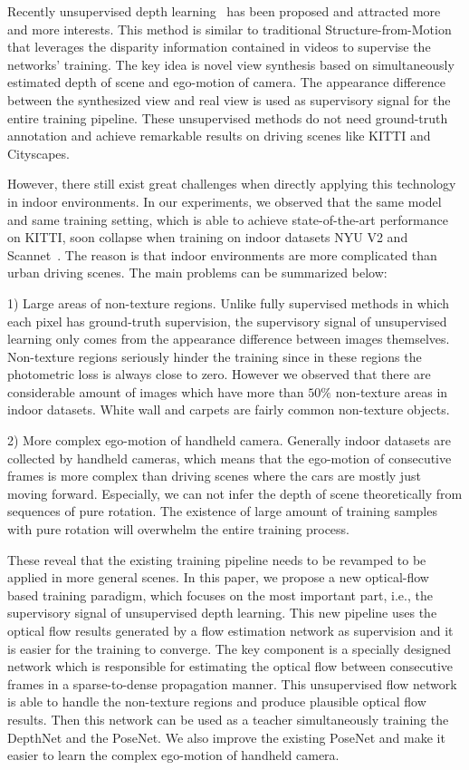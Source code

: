 \documentclass[10pt,twocolumn,letterpaper]{article}
\begin{document}
Recently unsupervised depth learning~\cite{zhou2017unsupervised,godard2017unsupervised,yin2018geonet} has been proposed and attracted more and more interests. This method is similar to traditional Structure-from-Motion that leverages the disparity information contained in videos to supervise the networks' training. The key idea is novel view synthesis based on simultaneously estimated depth of scene and ego-motion of camera. The appearance difference between the synthesized view and real view is used as supervisory signal for the entire training pipeline. These unsupervised methods do not need ground-truth annotation and achieve remarkable results on driving scenes like KITTI and Cityscapes. 

However, there still exist great challenges when directly applying this technology in indoor environments. In our experiments, we observed that the same model and same training setting, which is able to achieve state-of-the-art performance on KITTI, soon collapse when training on indoor datasets NYU V2\cite{silberman2012indoor} and Scannet~\cite{dai2017scannet}. The reason is that indoor environments are more complicated than urban driving scenes. The main problems can be summarized below:

1) Large areas of non-texture regions. Unlike fully supervised methods in which each pixel has ground-truth supervision, the supervisory signal of unsupervised learning only comes from the appearance difference between images themselves. Non-texture regions seriously hinder the training since in these regions the photometric loss is always close to zero. However we observed that there are considerable amount of images which have more than $50\%$ non-texture areas in indoor datasets. White wall and carpets are fairly common non-texture objects.

2) More complex ego-motion of handheld camera. Generally indoor datasets are collected by handheld cameras, which means that the ego-motion of consecutive frames is more complex than driving scenes where the cars are mostly just moving forward. Especially, we can not infer the depth of scene theoretically from sequences of pure rotation. The existence of large amount of training samples with pure rotation will overwhelm the entire training process. 

These reveal that the existing training pipeline needs to be revamped to be applied in more general scenes. In this paper, we propose a new optical-flow based training paradigm, which focuses on the most important part, i.e., the supervisory signal of unsupervised depth learning. This new pipeline uses the optical flow results generated by a flow estimation network as supervision and it is easier for the training to converge. The key component is a specially designed network which is responsible for estimating the optical flow between consecutive frames in a sparse-to-dense propagation manner. This unsupervised flow network is able to handle the non-texture regions and produce plausible optical flow results. Then this network can be used as a teacher simultaneously training the DepthNet and the PoseNet. We also improve the existing PoseNet and make it easier to learn the complex ego-motion of handheld camera.
\end{document}
